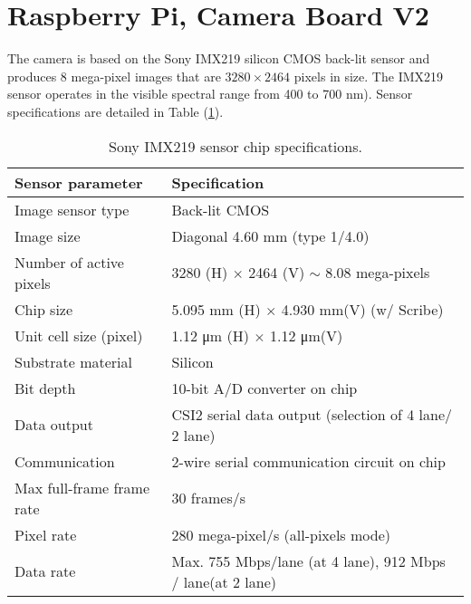 \section{Raspberry Pi, Camera Board V2}
\label{sec:raspicam}
The camera is based on the Sony IMX219 silicon CMOS back-lit sensor and produces
8 mega-pixel images that are $3280 \times 2464$ pixels in size.
The IMX219 sensor operates in the visible spectral range from 400 to 700 \si{\nano\meter}).\cite{raspberrycam2}
Sensor specifications are detailed in Table (\ref{tab:raspicamspec}).
%
\begin{table}[!h]
	\centering
	\caption{Sony IMX219 sensor chip specifications.}
	\label{tab:raspicamspec}
	\begin{tabular}{l l}
		\hline
		\textbf{Sensor parameter}			& 	\textbf{Specification}\\
		\hline
		Image sensor type		&	Back-lit CMOS\\
		\rowcolor{aliceblue!85} Image size				&	Diagonal 4.60 \si{\milli\meter} (type 1/4.0)\\
		Number of active pixels	&	3280 (H) $\times$ 2464 (V) $\sim$ 8.08 mega-pixels\\
		\rowcolor{aliceblue!85}Chip size				&	5.095 \si{\milli\meter} (H) $\times$ 4.930 \si{\milli\meter}(V) (w/ Scribe)\\	
		Unit cell size (pixel) 	&	1.12 \si{\micro\meter} (H) $\times$ 1.12 \si{\micro\meter}(V)\\
		\rowcolor{aliceblue!85}Substrate material		&	Silicon\\
		Bit depth				&	10-bit A/D converter on chip\\
		\rowcolor{aliceblue!85}Data output				&	CSI2 serial data output (selection of 4 lane/ 2 lane)\\
		Communication			&	2-wire serial communication circuit on chip\\
		\rowcolor{aliceblue!85}Max full-frame frame rate &	30 frames/s \\
		Pixel rate 				&	280 mega-pixel/s (all-pixels mode)\\
		\rowcolor{aliceblue!85}Data rate				&	Max. 755 Mbps/lane (at 4 lane), 912 Mbps / lane(at 2 lane)\\
		\hline
	\end{tabular}
\end{table}
%
